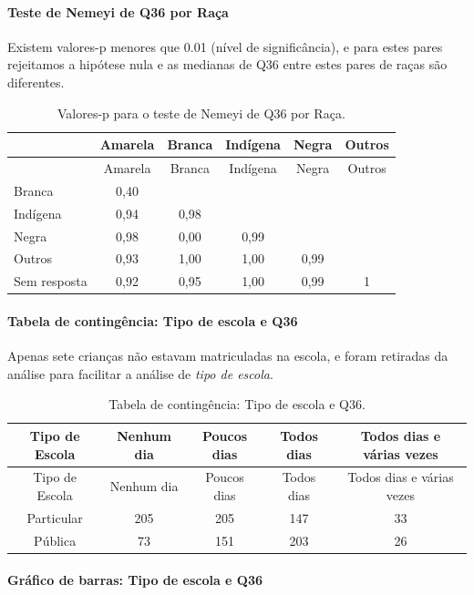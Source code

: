 \documentclass[]{article}
\let\oldparagraph\paragraph
\renewcommand{\paragraph}[1]{\oldparagraph{#1}\mbox{}}
\begin{document}
\hypertarget{teste-de-nemeyi-de-q36-por-rauxe7a}{%
\paragraph{Teste de Nemeyi de Q36 por Raça}\label{teste-de-nemeyi-de-q36-por-rauxe7a}}

Existem valores-p menores que 0.01 (nível de significância), e para estes pares rejeitamos a hipótese nula e as medianas de Q36 entre estes pares de raças são diferentes.

\begin{longtable}[]{@{}lccccc@{}}
\caption{\label{tab:unnamed-chunk-1350}Valores-p para o teste de Nemeyi de Q36 por Raça.}\tabularnewline
\toprule
& Amarela & Branca & Indígena & Negra & Outros\tabularnewline
\midrule
\endfirsthead
\toprule
& Amarela & Branca & Indígena & Negra & Outros\tabularnewline
\midrule
\endhead
Branca & 0,40 & & & &\tabularnewline
Indígena & 0,94 & 0,98 & & &\tabularnewline
Negra & 0,98 & 0,00 & 0,99 & &\tabularnewline
Outros & 0,93 & 1,00 & 1,00 & 0,99 &\tabularnewline
Sem resposta & 0,92 & 0,95 & 1,00 & 0,99 & 1\tabularnewline
\bottomrule
\end{longtable}

\cleardoublepage

\hypertarget{tabela-de-continguxeancia-tipo-de-escola-e-q36}{%
\paragraph{Tabela de contingência: Tipo de escola e Q36}\label{tabela-de-continguxeancia-tipo-de-escola-e-q36}}

Apenas sete crianças não estavam matriculadas na escola, e foram retiradas da análise para facilitar a análise de \emph{tipo de escola}.

\begin{longtable}[]{@{}ccccc@{}}
\caption{\label{tab:unnamed-chunk-1351}Tabela de contingência: Tipo de escola e Q36.}\tabularnewline
\toprule
Tipo de Escola & Nenhum dia & Poucos dias & Todos dias & Todos dias e várias vezes\tabularnewline
\midrule
\endfirsthead
\toprule
Tipo de Escola & Nenhum dia & Poucos dias & Todos dias & Todos dias e várias vezes\tabularnewline
\midrule
\endhead
Particular & 205 & 205 & 147 & 33\tabularnewline
Pública & 73 & 151 & 203 & 26\tabularnewline
\bottomrule
\end{longtable}

\hypertarget{gruxe1fico-de-barras-tipo-de-escola-e-q36}{%
\paragraph{Gráfico de barras: Tipo de escola e Q36}\label{gruxe1fico-de-barras-tipo-de-escola-e-q36}}
\end{document}
